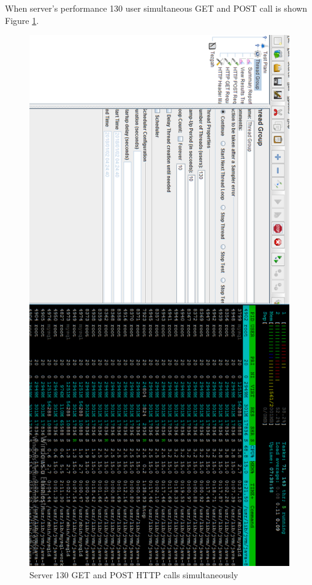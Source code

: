 \newpage

When server's performance 130 user simultaneous GET and POST call is shown Figure
\ref{fig:130users}.

\begin{figure}[!htbp]
\centering
\includegraphics[width=\textwidth]{projectChapters/images/130users.png}
\caption{Server 130 GET and POST HTTP calls simultaneously}
\label{fig:130users}
\end{figure}


